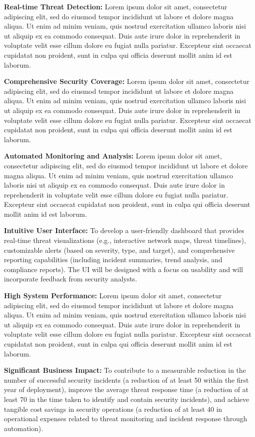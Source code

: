 \documentclass[12pt]{article}
\begin{document}
\textbf{Real-time Threat Detection:} Lorem ipsum dolor sit amet, consectetur adipiscing elit, sed do eiusmod tempor incididunt ut labore et dolore magna aliqua. Ut enim ad minim veniam, quis nostrud exercitation ullamco laboris nisi ut aliquip ex ea commodo consequat. Duis aute irure dolor in reprehenderit in voluptate velit esse cillum dolore eu fugiat nulla pariatur. Excepteur sint occaecat cupidatat non proident, sunt in culpa qui officia deserunt mollit anim id est laborum.

\textbf{Comprehensive Security Coverage:} Lorem ipsum dolor sit amet, consectetur adipiscing elit, sed do eiusmod tempor incididunt ut labore et dolore magna aliqua. Ut enim ad minim veniam, quis nostrud exercitation ullamco laboris nisi ut aliquip ex ea commodo consequat. Duis aute irure dolor in reprehenderit in voluptate velit esse cillum dolore eu fugiat nulla pariatur. Excepteur sint occaecat cupidatat non proident, sunt in culpa qui officia deserunt mollit anim id est laborum.

\textbf{Automated Monitoring and Analysis:} Lorem ipsum dolor sit amet, consectetur adipiscing elit, sed do eiusmod tempor incididunt ut labore et dolore magna aliqua. Ut enim ad minim veniam, quis nostrud exercitation ullamco laboris nisi ut aliquip ex ea commodo consequat. Duis aute irure dolor in reprehenderit in voluptate velit esse cillum dolore eu fugiat nulla pariatur. Excepteur sint occaecat cupidatat non proident, sunt in culpa qui officia deserunt mollit anim id est laborum.

\textbf{Intuitive User Interface:} To develop a user-friendly dashboard that provides real-time threat visualizations (e.g., interactive network maps, threat timelines), customizable alerts (based on severity, type, and target), and comprehensive reporting capabilities (including incident summaries, trend analysis, and compliance reports). The UI will be designed with a focus on usability and will incorporate feedback from security analysts.

\textbf{High System Performance:} Lorem ipsum dolor sit amet, consectetur adipiscing elit, sed do eiusmod tempor incididunt ut labore et dolore magna aliqua. Ut enim ad minim veniam, quis nostrud exercitation ullamco laboris nisi ut aliquip ex ea commodo consequat. Duis aute irure dolor in reprehenderit in voluptate velit esse cillum dolore eu fugiat nulla pariatur. Excepteur sint occaecat cupidatat non proident, sunt in culpa qui officia deserunt mollit anim id est laborum.

\textbf{Significant Business Impact:} To contribute to a measurable reduction in the number of successful security incidents (a reduction of at least 50 within the first year of deployment), improve the average threat response time (a reduction of at least 70 in the time taken to identify and contain security incidents), and achieve tangible cost savings in security operations (a reduction of at least 40 in operational expenses related to threat monitoring and incident response through automation).
\end{document}
